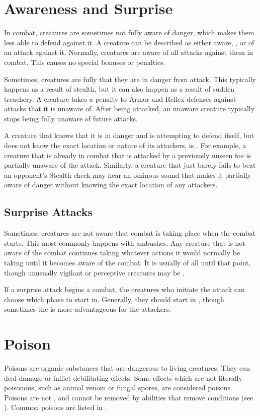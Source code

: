 \section{Awareness and Surprise}\label{Awareness and Surprise}
    In combat, creatures are sometimes not fully aware of danger, which makes them less able to defend against it.
    A creature can be described as either aware, \unaware, or \partiallyunaware of an attack against it.
    Normally, creatures are aware of all attacks against them in combat.
    This causes no special bonuses or penalties.

    Sometimes, creatures are fully \unaware that they are in danger from attack.
    This typically happens as a result of stealth, but it can also happen as a result of sudden treachery.
    A creature takes a  penalty to Armor and Reflex defenses against attacks that it is unaware of.
    After being attacked, an unaware creature typically stops being fully unaware of future attacks.

    A creature that knows that it is in danger and is attempting to defend itself, but does not know the exact location or nature of its attackers, is \partiallyunaware.
    For example, a creature that is already in combat that is attacked by a previously unseen foe is partially unaware of the attack.
    Similarly, a creature that just barely fails to beat an opponent's Stealth check may hear an ominous sound that makes it partially aware of danger without knowing the exact location of any attackers.

    \subsection{Surprise Attacks}\label{Surprise Attacks}
        Sometimes, creatures are not aware that combat is taking place when the combat starts.
        This most commonly happens with ambushes.
        Any creature that is not aware of the combat continues taking whatever actions it would normally be taking until it becomes aware of the combat.
        It is usually \unaware of all until that point, though unusually vigilant or perceptive creatures may be \partiallyunaware.

        If a surprise attack begins a combat, the creatures who initiate the attack can choose which phase to start in.
        Generally, they should start in , though sometimes the  is more advantageous for the attackers.

\section{Poison}\label{Poison}
    Poisons are organic substances that are dangerous to living creatures.
    They can deal damage or inflict debilitating effects.
    Some effects which are not literally poisonous, such as animal venom or fungal spores, are considered poisons.
    Poisons are not , and cannot be removed by abilities that remove conditions (see ).
    Common poisons are listed in .

